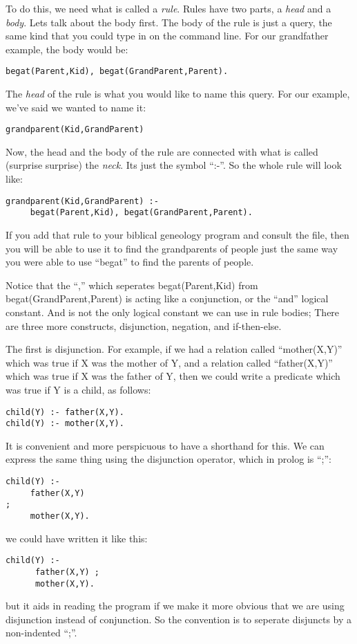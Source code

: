\documentclass{book}[9pt]
\begin{document}
To do this, we need what is called a {\em rule}. Rules have two
parts, a {\em head} and a {\em body}.  Lets talk about the body first.
The body of the rule is just a query, the same kind that you could type
in on the command line.  For our grandfather example, the body would be:
\begin{verbatim}
begat(Parent,Kid), begat(GrandParent,Parent). 
\end{verbatim}
\noindent  The {\em head} of the rule is what you would like to name this query. 
For our example, we've said we wanted to name it: 
\begin{verbatim}
grandparent(Kid,GrandParent)
\end{verbatim}
\noindent  Now, the head and the body of the rule are connected with what is
called (surprise surprise) the {\em neck}.  Its just the symbol ``:-''.  So the
whole rule will look like:
\begin{verbatim}
grandparent(Kid,GrandParent) :- 
     begat(Parent,Kid), begat(GrandParent,Parent). 
\end{verbatim}
\noindent If you add that rule to your biblical geneology program and
consult the file, then you will be able to use it to find the grandparents
of people just the same way you were able to use ``begat'' to find the parents
of people.

Notice that the ``,'' which seperates begat(Parent,Kid) from
begat(GrandParent,Parent) is acting like a conjunction, or the ``and''
logical constant.  And is not the only logical constant we can use in
rule bodies; There are three more constructs, disjunction, negation,
and if-then-else.

The first is disjunction.  For example, if we had a relation called
``mother(X,Y)'' which was true if X was the mother of Y, and a
relation called ``father(X,Y)'' which was true if X was the father of
Y, then we could write a predicate which was true if Y is a child, as
follows:
\begin{verbatim}
child(Y) :- father(X,Y).
child(Y) :- mother(X,Y).
\end{verbatim}
\noindent It is convenient and more perspicuous to have a shorthand
for this.  We can express the same thing using the disjunction
operator, which in prolog is ``;'':
\begin{verbatim}
child(Y) :-
     father(X,Y)
;
     mother(X,Y).
\end{verbatim}
\noindent we could have written it like this:
\begin{verbatim}
child(Y) :- 
      father(X,Y) ; 
      mother(X,Y).
\end{verbatim}
\noindent but it aids in reading the program if we make it more
obvious that we are using disjunction instead of conjunction.  So the
convention is to seperate disjuncts by a non-indented ``;''.
\end{document}

